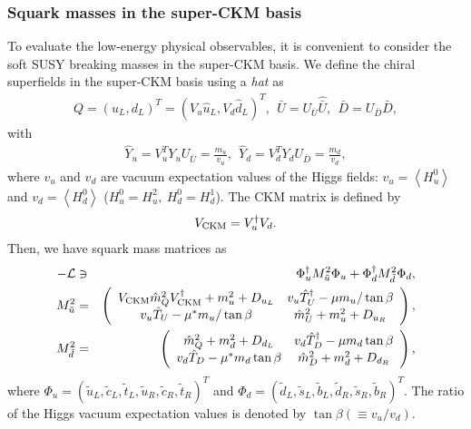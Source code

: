 \documentclass[preprint,3p,12pt]{elsarticle}
\begin{document}
{\subsubsection{Squark masses in the super-CKM basis}
To evaluate the low-energy physical observables, it is convenient to consider the soft SUSY breaking masses in the super-CKM basis. We define the chiral superfields in the super-CKM basis using a {\it hat} as
\begin{eqnarray}
Q = (u_L, d_L)^T= (V_u \hat u_L, V_d \hat d_L)^T,  \ \  \bar U = U_{\bar U} \hat{\bar U}, \ \ \bar D = U_{\bar D} \hat {\bar D},
\end{eqnarray}
with
\begin{eqnarray}
\hat Y_u = V_u^T Y_u U_{\bar U} = \frac{m_u}{v_u}, \ \ 
\hat Y_d = V_d^T Y_d U_{\bar D} = \frac{m_d}{v_d},
\end{eqnarray}
where $v_u$ and $v_d$ are vacuum expectation values of the Higgs fields: $v_u = \left<H_u^0\right>$ and $v_d = \left<H_d^0\right>$ ($H_u^0 = H_u^2, \ H_d^0 = H_d^1$). The CKM matrix is defined by 
\begin{eqnarray}
V_{\rm CKM} = V_u^\dag V_d.
\end{eqnarray}
Then, we have squark mass matrices as
\begin{eqnarray}
-\mathcal{L} &\ni& \Phi_u^\dag  M_{\tilde u}^2 \Phi_u + \Phi_d^\dag  M_{\tilde d}^2 \Phi_d, \nonumber \\
M_{\tilde u}^2 &=& 
\left(
\begin{array}{cc}
V_{\rm CKM} \hat m_Q^2 V_{\rm CKM}^\dag + m_u^2 + D_{u_L}&    v_u \hat T_U^\dag - \mu m_u /\tan\beta  \\
v_u \hat T_U  - \mu^* m_u /\tan\beta&    \hat m_{U}^2 + m_u^2 + D_{u_R}\\
\end{array}
\right),
\nonumber \\  
M_{\tilde d}^2 &=& 
\left(
\begin{array}{cc}
\hat m_Q^2  + m_d^2 + D_{d_L} &   v_d \hat T_D^\dag - \mu m_d \tan\beta  \\
 v_d \hat T_D - \mu^* m_d \tan\beta  &    \hat m_{D}^2 + m_d^2 + D_{d_R} \\
\end{array}
\right),
\end{eqnarray}
where $\Phi_u = \left( \tilde u_L, \tilde c_L,  \tilde t_L,  \tilde u_R, \tilde c_R,  \tilde t_R
\right)^T$ and 
$\Phi_d = \left( \tilde d_L,  \tilde s_L,  \tilde b_L,
\tilde d_R,  \tilde s_R,  \tilde b_R
 \right)^T$. The ratio of the Higgs vacuum expectation values is denoted by $\tan\beta ( \equiv v_u/v_d)$. 
}
\end{document}
